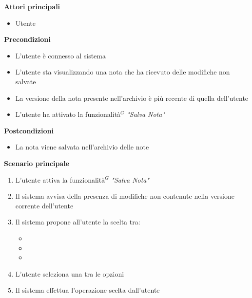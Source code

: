 \documentclass[a4paper,10pt]{article}
\begin{document}
    \textbf{Attori principali}
    \begin{itemize}
        \item Utente
    \end{itemize}
    \textbf{Precondizioni}
    \begin{itemize}
        \item L'utente è connesso al sistema
        \item L'utente sta visualizzando una nota che ha ricevuto delle modifiche non salvate
        \item La versione della nota presente nell'archivio è più recente di quella dell'utente
        \item L'utente ha attivato la funzionalità$^G$ \textit{"Salva Nota"}
    \end{itemize}
    \textbf{Postcondizioni}
    \begin{itemize}
        \item La nota viene salvata nell'archivio delle note
    \end{itemize}
    \textbf{Scenario principale}
    \begin{enumerate}
        \item L'utente attiva la funzionalità$^G$ \textit{"Salva Nota"}
        \item Il sistema avvisa della presenza di modifiche non contenute nella versione corrente dell'utente
        \item Il sistema propone all'utente la scelta tra:
            \begin{itemize}
                \item {}
                \item {}
                \item {}
            \end{itemize}
            \item L'utente seleziona una tra le opzioni
            \item Il sistema effettua l'operazione scelta dall'utente
    \end{enumerate}
\end{document}
